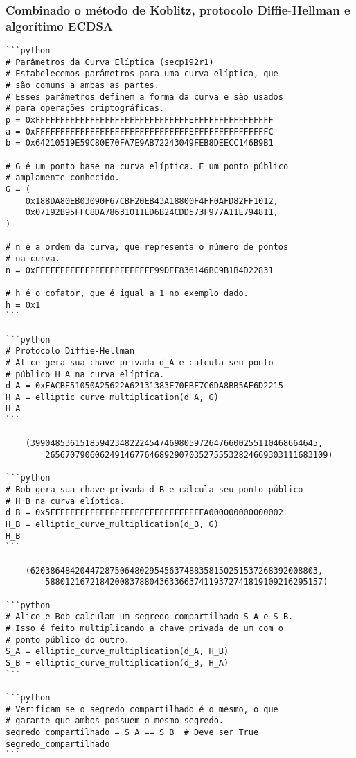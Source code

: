 \subsubsection{Combinado o método de Koblitz, protocolo Diffie-Hellman e algorítimo ECDSA} \label{subsubsection:0c8b3ddb-a93d-4282-91bf-becf475f36a1}
\begin{verbatim}
```python
# Parâmetros da Curva Elíptica (secp192r1)
# Estabelecemos parâmetros para uma curva elíptica, que
# são comuns a ambas as partes.
# Esses parâmetros definem a forma da curva e são usados
# para operações criptográficas.
p = 0xFFFFFFFFFFFFFFFFFFFFFFFFFFFFFFFEFFFFFFFFFFFFFFFF
a = 0xFFFFFFFFFFFFFFFFFFFFFFFFFFFFFFFEFFFFFFFFFFFFFFFC
b = 0x64210519E59C80E70FA7E9AB72243049FEB8DEECC146B9B1

# G é um ponto base na curva elíptica. É um ponto público
# amplamente conhecido.
G = (
	0x188DA80EB03090F67CBF20EB43A18800F4FF0AFD82FF1012,
	0x07192B95FFC8DA78631011ED6B24CDD573F977A11E794811,
)

# n é a ordem da curva, que representa o número de pontos
# na curva.
n = 0xFFFFFFFFFFFFFFFFFFFFFFFF99DEF836146BC9B1B4D22831

# h é o cofator, que é igual a 1 no exemplo dado.
h = 0x1
```

```python
# Protocolo Diffie-Hellman
# Alice gera sua chave privada d_A e calcula seu ponto
# público H_A na curva elíptica.
d_A = 0xFACBE51050A25622A62131383E70EBF7C6DA8BB5AE6D2215
H_A = elliptic_curve_multiplication(d_A, G)
H_A
```

	(3990485361518594234822245474698059726476600255110468664645,
		265670790606249146776468929070352755532824669303111683109)

```python
# Bob gera sua chave privada d_B e calcula seu ponto público
# H_B na curva elíptica.
d_B = 0x5FFFFFFFFFFFFFFFFFFFFFFFFFFFFFFFA000000000000002
H_B = elliptic_curve_multiplication(d_B, G)
H_B
```

	(6203864842044728750648029545637488358150251537268392008803,
		58801216721842008378804363366374119372741819109216295157)

```python
# Alice e Bob calculam um segredo compartilhado S_A e S_B.
# Isso é feito multiplicando a chave privada de um com o
# ponto público do outro.
S_A = elliptic_curve_multiplication(d_A, H_B)
S_B = elliptic_curve_multiplication(d_B, H_A)
```

```python
# Verificam se o segredo compartilhado é o mesmo, o que
# garante que ambos possuem o mesmo segredo.
segredo_compartilhado = S_A == S_B  # Deve ser True
segredo_compartilhado
```


\end{verbatim}
